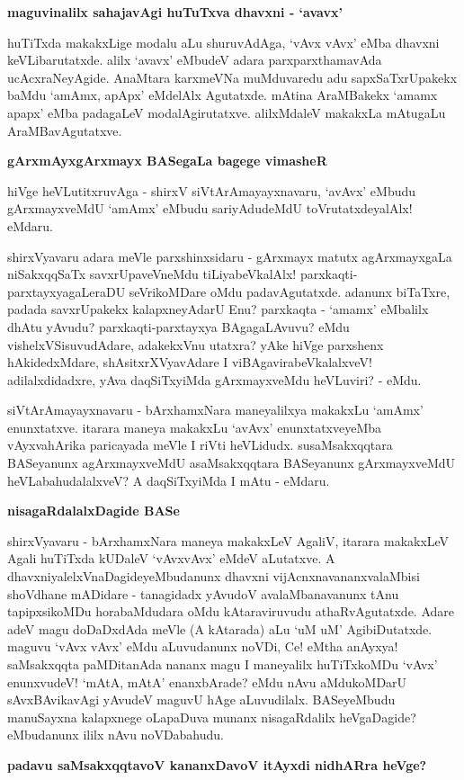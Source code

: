 \noindent
\textbf{maguvinalilx sahajavAgi huTuTxva dhavxni - `avavx'}\label{page6}

huTiTxda makakxLige modalu aLu shuruvAdAga, `vAvx vAvx' eMba dhavxni keVLibarutatxde. alilx `avavx' eMbudeV adara parxparxthamavAda ucAcxraNeyAgide. AnaMtara karxmeVNa muMduvaredu adu sapxSaTxrUpakekx baMdu `amAmx, apApx' eMdelAlx Agutatxde. mAtina AraMBakekx `amamx apapx' eMba padagaLeV modalAgirutatxve. alilxMdaleV makakxLa mAtugaLu AraMBavAgutatxve. 

\noindent
\textbf{gArxmAyxgArxmayx BASegaLa bagege vimasheR}\label{page6}

hiVge heVLutitxruvAga - shirxV siVtArAmayayxnavaru, `avAvx' eMbudu gArxmayxveMdU `amAmx' eMbudu sariyAdudeMdU toVrutatxdeyalAlx! eMdaru.

shirxVyavaru adara meVle parxshinxsidaru - gArxmayx matutx agArxmayxgaLa niSakxqqSaTx savxrUpaveVneMdu tiLiyabeVkalAlx! parxkaqti-parxtayxyagaLeraDU seVrikoMDare oMdu padavAgutatxde. adanunx biTaTxre, padada savxrUpakekx kalapxneyAdarU Enu? parxkaqta - `amamx' eMbalilx dhAtu yAvudu? parxkaqti-parxtayxya BAgagaLAvuvu? eMdu vishelxVSisuvudAdare, adakekxVnu utatxra? yAke hiVge parxshenx hAkidedxMdare, shAsitxrXVyavAdare I viBAgavirabeVkalalxveV! adilalxdidadxre, yAva daqSiTxyiMda gArxmayxveMdu heVLuviri? - eMdu.

siVtArAmayayxnavaru - bArxhamxNara maneyalilxya makakxLu `amAmx' enunxtatxve. itarara maneya makakxLu `avAvx' enunxtatxveyeMba vAyxvahArika paricayada meVle I riVti heVLidudx. susaMsakxqqtara BASeyanunx agArxmayxveMdU asaMsakxqqtara BASeyanunx gArxmayxveMdU heVLabahudalalxveV? A daqSiTxyiMda I mAtu - eMdaru.

\noindent
\textbf{nisagaRdalalxDagide BASe}

shirxVyavaru - bArxhamxNara maneya makakxLeV AgaliV, itarara makakxLeV Agali huTiTxda kUDaleV `vAvxvAvx' eMdeV aLutatxve. A dhavxniyalelxVnaDagideyeMbudanunx dhavxni vijAcnxnavananxvalaMbisi shoVdhane mADidare - tanagidadx yAvudoV avalaMbanavanunx tAnu tapipxsikoMDu horabaMdudara oMdu kAtaraviruvudu athaRvAgutatxde. Adare adeV magu doDaDxdAda meVle (A kAtarada) aLu `uM uM' AgibiDutatxde. maguvu `vAvx vAvx' eMdu aLuvudanunx noVDi, Ce! eMtha anAyxya! saMsakxqqta paMDitanAda nananx magu I maneyalilx huTiTxkoMDu `vAvx' enunxvudeV! `mAtA, mAtA' enanxbArade? eMdu nAvu aMdukoMDarU sAvxBAvikavAgi yAvudeV maguvU hAge aLuvudilalx. BASeyeMbudu manuSayxna kalapxnege oLapaDuva munanx nisagaRdalilx heVgaDagide? eMbudanunx ililx nAvu noVDabahudu.

\noindent
\textbf{padavu saMsakxqqtavoV kananxDavoV itAyxdi nidhARra heVge?}\label{page7}

